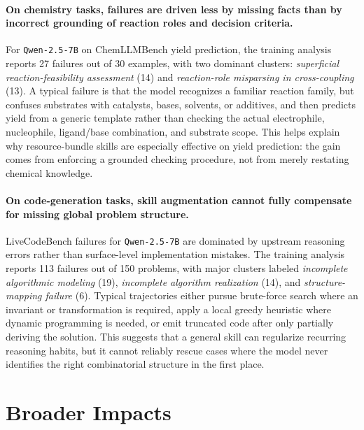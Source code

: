 \documentclass{article}
\begin{document}
\paragraph{\textbf{On chemistry tasks, failures are driven less by missing facts than by incorrect grounding of reaction roles and decision criteria.}}
For \texttt{Qwen-2.5-7B} on ChemLLMBench yield prediction, the training analysis reports 27 failures out of 30 examples, with two dominant clusters: \emph{superficial reaction-feasibility assessment} (14) and \emph{reaction-role misparsing in cross-coupling} (13). A typical failure is that the model recognizes a familiar reaction family, but confuses substrates with catalysts, bases, solvents, or additives, and then predicts yield from a generic template rather than checking the actual electrophile, nucleophile, ligand/base combination, and substrate scope. This helps explain why resource-bundle skills are especially effective on yield prediction: the gain comes from enforcing a grounded checking procedure, not from merely restating chemical knowledge.

\paragraph{\textbf{On code-generation tasks, skill augmentation cannot fully compensate for missing global problem structure.}}
LiveCodeBench failures for \texttt{Qwen-2.5-7B} are dominated by upstream reasoning errors rather than surface-level implementation mistakes. The training analysis reports 113 failures out of 150 problems, with major clusters labeled \emph{incomplete algorithmic modeling} (19), \emph{incomplete algorithm realization} (14), and \emph{structure-mapping failure} (6). Typical trajectories either pursue brute-force search where an invariant or transformation is required, apply a local greedy heuristic where dynamic programming is needed, or emit truncated code after only partially deriving the solution. This suggests that a general skill can regularize recurring reasoning habits, but it cannot reliably rescue cases where the model never identifies the right combinatorial structure in the first place.


\section{Broader Impacts}
\label{sec:broader-impacts}
\end{document}
